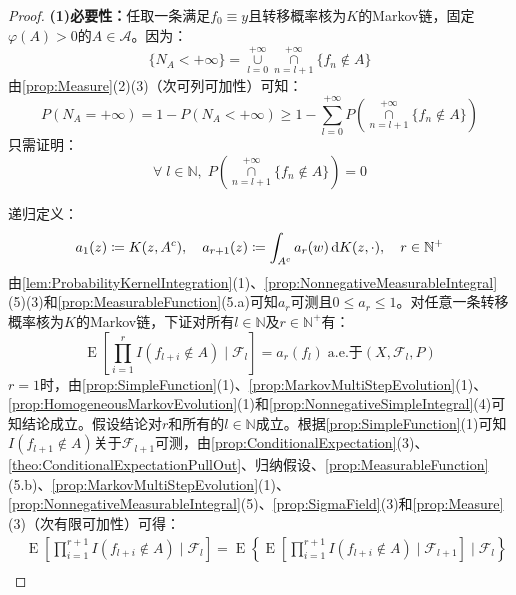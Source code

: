 \begin{proof}
	\textbf{(1)必要性：}任取一条满足$f_0\equiv y$且转移概率核为$K$的Markov链，固定$\varphi(A)>0$的$A\in\mathscr{A}$。因为：
	\begin{equation*}
		\{N_A<+\infty\}=\underset{l=0}{\overset{+\infty}{\cup}}\underset{n=l+1}{\overset{+\infty}{\cap}}\{f_n\notin A\}
	\end{equation*}
	由\cref{prop:Measure}(2)(3)（次可列可加性）可知：
	\begin{equation*}
		P(N_A=+\infty)=1-P(N_A<+\infty)\geqslant1-\sum_{l=0}^{+\infty}P\left(\underset{n=l+1}{\overset{+\infty}{\cap}}\{f_n\notin A\}\right)
	\end{equation*}
	只需证明：
	\begin{equation*}
		\forall\;l\in\mathbb{N},\;P\left(\underset{n=l+1}{\overset{+\infty}{\cap}}\{f_n\notin A\}\right)=0
	\end{equation*}\par
	递归定义：
	\begin{equation*}
		a_1(z)\coloneq K(z,A^c),\quad a_{r+1}(z)\coloneq\int_{A^c}a_r(w)\mathop{}\!\mathrm{d} K(z,\cdot),\quad r\in\mathbb{N}^+
	\end{equation*}
	由\cref{lem:ProbabilityKernelIntegration}(1)、\cref{prop:NonnegativeMeasurableIntegral}(5)(3)和\cref{prop:MeasurableFunction}(5.a)可知$a_r$可测且$0\leqslant a_r\leqslant1$。对任意一条转移概率核为$K$的Markov链，下证对所有$l\in\mathbb{N}$及$r\in\mathbb{N}^+$有：
	\begin{equation*}
		\operatorname{E}\left[\prod_{i=1}^r I(f_{l+i}\notin A)\mid\mathscr{F}_l\right]=a_r(f_l)\;\text{a.e.于}(X,\mathscr{F}_l,P)
	\end{equation*}
	$r=1$时，由\cref{prop:SimpleFunction}(1)、\cref{prop:MarkovMultiStepEvolution}(1)、\cref{prop:HomogeneousMarkovEvolution}(1)和\cref{prop:NonnegativeSimpleIntegral}(4)可知结论成立。假设结论对$r$和所有的$l\in\mathbb{N}$成立。根据\cref{prop:SimpleFunction}(1)可知$I(f_{l+1}\notin A)$关于$\mathscr{F}_{l+1}$可测，由\cref{prop:ConditionalExpectation}(3)、\cref{theo:ConditionalExpectationPullOut}、归纳假设、\cref{prop:MeasurableFunction}(5.b)、\cref{prop:MarkovMultiStepEvolution}(1)、\cref{prop:NonnegativeMeasurableIntegral}(5)、\cref{prop:SigmaField}(3)和\cref{prop:Measure}(3)（次有限可加性）可得：
	\begin{align*}
		&\operatorname{E}\left[\prod_{i=1}^{r+1}I(f_{l+i}\notin A)\mid\mathscr{F}_l\right]=\operatorname{E}\left\{\operatorname{E}\left[\prod_{i=1}^{r+1}I(f_{l+i}\notin A)\mid\mathscr{F}_{l+1}\right]\mid\mathscr{F}_l\right\} \\

\end{align*}
\end{proof}
